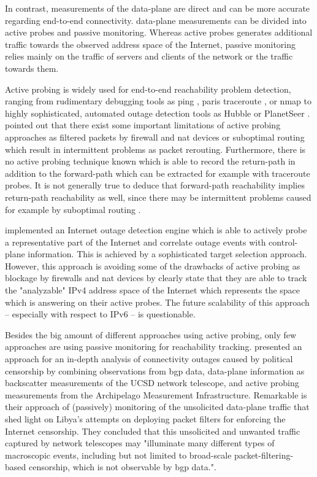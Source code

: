 In contrast, measurements of the \gls{data-plane} are direct and can be more accurate regarding end-to-end connectivity. 
\Gls{data-plane} measurements can be divided into active probes and passive monitoring. 
Whereas active probes generates additional traffic towards the observed address space of the Internet, passive monitoring relies mainly on the traffic of servers and clients of the network or the traffic towards them. 

Active probing is widely used for end-to-end reachability problem detection, ranging from rudimentary debugging tools as ping \citep{PING}, paris traceroute \citep{traceroute}, or nmap \citep{Nmap} to highly sophisticated, automated
outage detection tools as Hubble \citep{Katz:2008} or PlanetSeer \citep{Zhang:2004}. 
\citet{Bush:Optometry} pointed out that there exist some important limitations of active probing approaches as filtered packets by firewall and \gls{nat} devices or suboptimal routing which result in intermittent problems as packet rerouting.
Furthermore, there is no active probing technique known which is able to record the return-path in addition to the forward-path which can be extracted for example with traceroute probes. 
It is not generally true to deduce that forward-path reachability implies return-path reachability as well, since there may be intermittent problems caused for example by suboptimal routing \citep{Bush:Optometry}.

\citet{Quan12a} implemented an Internet outage detection engine which is able to actively probe a representative part of the Internet and correlate outage events with \gls{control-plane} information. 
This is achieved by a sophisticated target selection approach. 
However, this approach is avoiding some of the drawbacks of active probing as blockage by firewalls and \gls{nat} devices by clearly state that they are able to track the "analyzable" \gls{IPv4} address space of the Internet which represents the space which is answering on their active probes.
The future scalability of this approach -- especially with respect to \gls{IPv6} -- is questionable. 

Besides the big amount of different approaches using active probing, only few approaches are using passive monitoring for reachability tracking. 
\citet{Dainotti:2011:ACI} presented an approach for an in-depth analysis of connectivity outages caused by political censorship by combining observations from \gls{bgp} data, \gls{data-plane} information as backscatter measurements of the UCSD network telescope, and active probing measurements from the Archipelago Measurement Infrastructure. 
Remarkable is their approach of (passively) monitoring of the unsolicited \gls{data-plane} traffic that shed light on Libya's attempts on deploying packet filters for enforcing the Internet censorship. 
They concluded that this unsolicited and unwanted traffic captured by network telescopes may "illuminate many different types of macroscopic events, including but not limited to broad-scale packet-filtering-based censorship, which is not observable by \gls{bgp} data."\citep{Dainotti:2011:ACI}.

